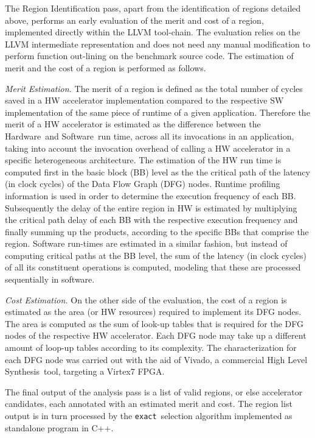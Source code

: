 \documentclass[]{usiinfthesis}
\newcommand{\HW}{{Hardware}}
\newcommand{\SW}{{Software}}
\newcommand{\HLS}{{High Level Synthesis}}
\newcommand{\exact}{\texttt{exact}}
\begin{document}
The Region Identification pass, apart from the identification of regions detailed above, 
performs an early evaluation of the merit and cost of a region, implemented
directly within the LLVM tool-chain. The evaluation relies on the LLVM intermediate
representation and does not need any manual modification to perform function out-lining
on the benchmark source code. 
The estimation of merit and the cost of a region is performed as follows.\par

\emph{Merit Estimation.} 
The merit of a region is defined as the total number of cycles saved in a HW accelerator 
implementation compared to the respective SW implementation of the same piece of runtime 
of a given application. Therefore the merit of a HW accelerator is estimated as the 
difference between the \HW\ and \SW\ run time, across all its invocations in an application,
taking into account the invocation overhead of calling a HW accelerator in a specific 
heterogeneous architecture. The estimation of the HW run time is computed first in the 
basic block (BB) level as the the critical path of the latency (in clock cycles) of the Data 
Flow Graph (DFG) nodes. Runtime profiling information is used in order to determine the execution 
frequency of each BB.
Subsequently the delay of the entire region in HW is estimated by multiplying the critical path
delay of each BB with the respective execution frequency and finally summing up the products, 
according to the specific BBs that comprise the region.
Software run-times are estimated in a similar fashion, but instead of computing critical paths 
at the BB level, the sum of the latency (in clock cycles) of all its constituent operations is 
computed, modeling that these are processed sequentially in software.\par

\emph{Cost Estimation.} On the other side of the evaluation, the cost of a region 
is estimated as the area (or HW resources) required to implement its DFG nodes. The area 
is computed as the sum of look-up tables that is required for
the DFG nodes of the respective HW accelerator. Each DFG node may take up a different amount
of loop-up tables according to its complexity. The characterization for each DFG node was carried
out with the aid of Vivado, a commercial \HLS\ tool, targeting a Virtex7 FPGA.\par
The final output of the analysis pass is a list of valid regions, 
or else accelerator candidates, each annotated with an estimated merit and cost.
The region list output is in turn processed by the 
\exact\ selection algorithm implemented as standalone program in C++.
\end{document}
